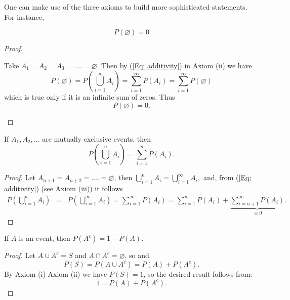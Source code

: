 \documentclass[notes=show,handout]{beamer}\usepackage[]{graphicx}\usepackage[]{color}
\newcommand{\bea}{\begin{eqnarray}}
\newcommand{\eea}{\end{eqnarray}}
\newcommand{\nn}{\nonumber}
\begin{document}
\begin{frame}{\secname}
  One can make use of the three axioms to build more sophisticated statements. For instance,

  \begin{theorem}
  $$P(\varnothing)=0$$
  \end{theorem}
  \pause
  \begin{proof}
  \begin{footnotesize}
  Take $A_1=A_2=A_3=....=\varnothing$. Then by (\ref{Eq: additivity}) in Axiom (ii) we have
  $$
  P(\varnothing)= P\left(  \bigcup_{i=1}^{\infty} A_i \right)
  = \sum_{i=1}^{\infty} P(A_i)
  =\sum_{i=1}^{\infty} P(\varnothing)
  $$
  which is true only if it is an infinite sum of zeros. Thus
  $$
  P(\varnothing) =  0.
  $$
  \end{footnotesize}
  \end{proof}
\end{frame}

\begin{frame}{\secname}
  \begin{theorem}
  If $A_1, A_2,...$ are mutually exclusive events, then
  \begin{equation}
  P\left(  \bigcup_{i=1}^{n} A_i \right) = \sum_{i=1}^{n} P(A_i).  \label{Eq: ProbUnionDisj}
  \end{equation}
  \end{theorem} %

  \pause

  \begin{footnotesize}
  \begin{proof}
  Let $A_{n+1}=A_{n+2}=....=\varnothing$, then
  $
  \bigcup_{i=1}^{n} A_i = \bigcup_{i=1}^{\infty} A_i,
  $
  and, from (\ref{Eq: additivity}) (see Axiom (iii)) it follows
  \bea
  P\left(  \bigcup_{i=1}^{n} A_i \right) &=& P\left(  \bigcup_{i=1}^{\infty} A_i \right)
  = \sum_{i=1}^{\infty} P(A_i) = \sum_{i=1}^{n} P(A_i) + \underbrace{\sum_{i=n+1}^{\infty} P(A_i)}_{\equiv 0}. \nn
  \eea
  \end{proof}
  \end{footnotesize}
\end{frame}

\begin{frame}{\secname}
  \begin{theorem}
  If $A$ is an event, then
  $
  P(  A^c ) = 1- P(A).
  $
  \end{theorem} \vspace{0.1cm}


  \begin{footnotesize}
  \begin{proof}
  Let $A \cup A^c =S$ and $A \cap A^c = \varnothing$, so
  and
  $$
  P( S ) = P\left(A \cup A^c \right) =P(A) + P\left(A^c \right). \nn
  $$
  By Axiom (i) Axiom (ii) we have $P(S)=1$, so the desired result follows from:
  $$
  1 = P(A) + P\left(A^c \right).
  $$
  \end{proof}
  \end{footnotesize}
\end{frame}
\end{document}

